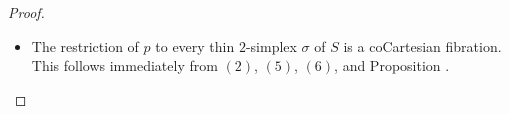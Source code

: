 \begin{proof}
\begin{itemize}
\item[$(7)$] The restriction of $p$ to every thin $2$-simplex $\sigma$ of $S$ is a coCartesian fibration.
This follows immediately from $(2)$, $(5)$, $(6)$, and Proposition .
\end{itemize}
\end{proof}

%





